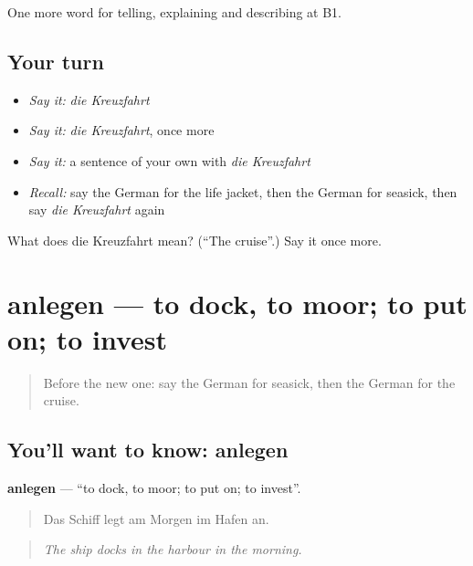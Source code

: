 \begin{grammarlens}[title={What you've built}]
One more word for telling, explaining and describing at B1.
\end{grammarlens}

\subsection*{Your turn}
\begin{itemize}
\raggedright
  \item \emph{Say it:} \emph{die Kreuzfahrt}
  \item \emph{Say it:} \emph{die Kreuzfahrt}, once more
  \item \emph{Say it:} a sentence of your own with \emph{die Kreuzfahrt}
  \item \emph{Recall:} say the German for the life jacket, then the German for seasick, then say \emph{die Kreuzfahrt} again
\end{itemize}

\begin{tcolorbox}[breakable,colback=teal!4,colframe=teal!35!black,title={Before you move on}]
What does die Kreuzfahrt mean? (\textquotedblleft{}The cruise\textquotedblright{}.) Say it once more.
\end{tcolorbox}
\section[anlegen]{anlegen — to dock, to moor; to put on; to invest}

\label{lesson:GE-C422-anlegen}



\begin{quote}
Before the new one: say the German for seasick, then the German for the cruise.
\end{quote}

\subsection*{You'll want to know: anlegen}
\textbf{anlegen} — \textquotedblleft{}to dock, to moor; to put on; to invest\textquotedblright{}.

\begin{quote}
Das Schiff legt am Morgen im Hafen an.
\end{quote}

\begin{quote}
\emph{The ship docks in the harbour in the morning.}
\end{quote}

